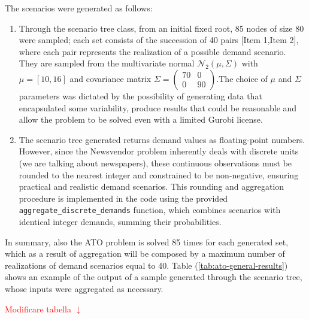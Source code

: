 \documentclass[a4paper,12pt]{article}
\begin{document}
	\noindent The scenarios were generated as follows: 
	\begin{enumerate}
		\item Through the scenario tree class, from an initial fixed root, 85 nodes of size 80 were sampled; each set consists of the succession of 40 pairs [Item 1,Item 2], where each pair represents the realization of a possible demand scenario. They are sampled from the multivariate normal $\mathcal{N}_{2}(\mu, \Sigma)$ with $\mu = [10,16]$ and covariance matrix $\Sigma =  \begin{pmatrix} 70 &0  \\ 0 &90  \end{pmatrix} $.The choice of $\mu$ and $\Sigma$ parameters was dictated by the possibility of generating data that encapsulated some variability, produce results that could be reasonable and allow the problem to be solved even with a limited Gurobi license. 
		
		\item The scenario tree generated returns demand values as floating-point numbers. However, since the Newsvendor problem inherently deals with discrete units (we are talking about newspapers), these continuous observations must be rounded to the nearest integer and constrained to be non-negative, ensuring practical and realistic demand scenarios. This rounding and aggregation procedure is implemented in the code using the provided \texttt{aggregate\_discrete\_demands} function, which combines scenarios with identical integer demands, summing their probabilities.
		
	\end{enumerate}
	
	\noindent In summary, also the ATO problem is solved 85 times for each generated set, which as a result of aggregation will be composed by a maximum number of realizations of demand scenarios equal to 40. Table (\ref{tab:ato-general-results}) shows an example of the output of a sample generated through the scenario tree, whose inputs were aggregated as necessary.
	
	\noindent \textcolor{red}{Modificare tabella $\downarrow$}\\
	
\end{document}
